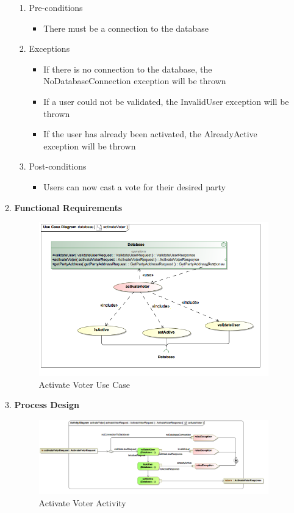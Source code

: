 \begin{enumerate}
\begin{enumerate}
			\begin{enumerate}
				\item Pre-conditions
				\begin{itemize}
					\item There must be a connection to the database
				\end{itemize}
				
				\item Exceptions
				\begin{itemize}
						\item If there is no connection to the database, the NoDatabaseConnection exception will be thrown
						\item If a user could not be validated, the InvalidUser exception will be thrown
						\item If the user has already been activated, the AlreadyActive exception will be thrown
				\end{itemize}
				
				\item Post-conditions
				\begin{itemize}
					\item Users can now cast a vote for their desired party
				\end{itemize}
			\end{enumerate}
			
			\newpage
			
			\item \textbf{Functional Requirements}
			\begin{figure}[H]
				\centering
				\includegraphics[width=0.75\linewidth]{../Images/Database/UseCases/ActivateVoter_UseCase.png}
				\caption{Activate Voter Use Case}
			\end{figure}
			
			\item \textbf{Process Design}
			\begin{figure}[H]
				\centering
				\includegraphics[width=0.75\linewidth]{../Images/Database/Activity/ActivateVoter_Activity.png}
				\caption{Activate Voter Activity}
			\end{figure}
			
		\end{enumerate}
\end{enumerate}